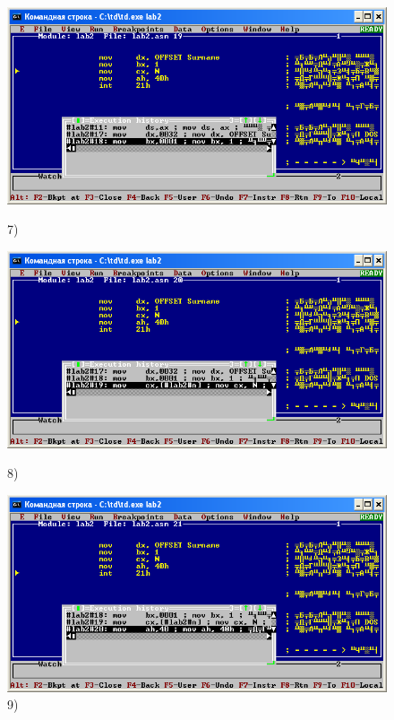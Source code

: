 \begin{figure}[!htp]
    \centering
    \begin{minipage}{0.32\textwidth}
        \centering
        \includegraphics[width=.99\linewidth]
            {../_INCLUDES/task-4-17-1/7.png}
        \caption{7) }
        \label{fig:task_4_17_2__7}
    \end{minipage}
    \begin {minipage}{0.32\textwidth}
        \centering
        \includegraphics[width=.99\linewidth]
            {../_INCLUDES/task-4-17-1/8.png}
        \caption{8) }
        \label{fig:task_4_17_2__8}
    \end{minipage}
    \begin {minipage}{0.32\textwidth}
        \centering
        \includegraphics[width=.99\linewidth]
            {../_INCLUDES/task-4-17-1/9.png}
        \caption{9) }
        \label{fig:task_4_17_2__9}
    \end{minipage}
\end{figure}

